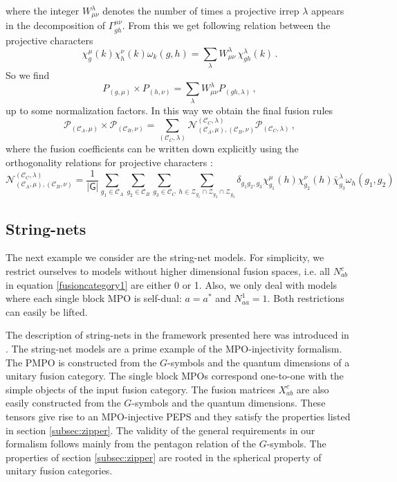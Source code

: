 \documentclass[12 pt]{article}
\begin{document}
where the integer $W_{\mu\nu}^\lambda$ denotes the number of times a projective irrep $\lambda$ appears in the decomposition of $\Gamma^{\mu\nu}_{gh}$. From this we get following relation between the projective characters
\begin{equation}
\chi_g^\mu(k)\chi_h^\nu(k)\omega_k (g,h) = \sum_{\lambda} W_{\mu\nu}^\lambda\, \chi_{gh}^\lambda (k)\, .
\end{equation}
So we find
\begin{equation}
P_{(g,\mu)}\times P_{(h,\nu)} = \sum_\lambda W^\lambda_{\mu\nu} P_{(gh,\lambda)}\, ,
\end{equation}
up to some normalization factors. In this way we obtain the final fusion rules
\begin{equation}
\mathcal{P}_{(\mathcal{C}_A,\mu)}\times \mathcal{P}_{(\mathcal{C}_B,\nu)} = \sum_{(\mathcal{C}_C,\lambda)} \mathscr{N}_{(\mathcal{C}_A,\mu),(\mathcal{C}_B,\nu)}^{(\mathcal{C}_C,\lambda)} \mathcal{P}_{(\mathcal{C}_C,\lambda)}\, ,
\end{equation}
where the fusion coefficients can be written down explicitly using the orthogonality relations for projective characters \cite{orbifold,DijkgraafWitten}:
\begin{equation}
\mathscr{N}_{(\mathcal{C}_A,\mu),(\mathcal{C}_B,\nu)}^{(\mathcal{C}_C,\lambda)} = \frac{1}{|\mathsf{G}|}\sum_{g_1\in \mathcal{C}_A} \sum_{g_2\in\mathcal{C}_B}\sum_{g_3 \in \mathcal{C}_C}\sum_{h\in\mathcal{Z}_{g_1}\cap \mathcal{Z}_{g_2}\cap \mathcal{Z}_{g_3}} \delta_{g_1g_2, g_3}\chi_{g_1}^\mu(h)\chi^\nu_{g_2}(h)\bar{\chi}^{\lambda}_{g_3}\omega_h(g_1,g_2)
\end{equation}


\subsection{String-nets}
The next example we consider are the string-net models. For simplicity, we restrict ourselves to models without higher dimensional fusion spaces, i.e. all $N_{ab}^c$ in equation \eqref{fusioncategory1} are either 0 or 1. Also, we only deal with models where each single block MPO is self-dual: $a=a^*$ and $N_{aa}^1=1$. Both restrictions can easily be lifted.

The description of string-nets in the framework presented here was introduced in \cite{MPOpaper}. The string-net models are a prime example of the MPO-injectivity formalism. The PMPO is constructed from the $G$-symbols and the quantum dimensions of a unitary fusion category. The single block MPOs correspond one-to-one with the simple objects of the input fusion category. The fusion matrices $X_{ab}^c$ are also easily constructed from the $G$-symbols and the quantum dimensions. These tensors give rise to an MPO-injective PEPS and they satisfy the properties listed in section \ref{subsec:zipper}. The validity of the general requirements in our formalism follows mainly from the pentagon relation of the $G$-symbols. The properties of section \ref{subsec:zipper} are rooted in the spherical property of unitary fusion categories.
\end{document}
